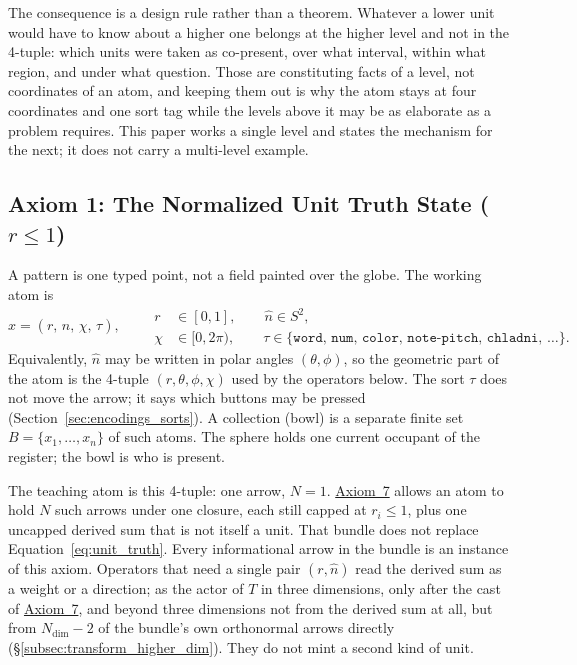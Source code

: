 \documentclass[12pt, a4paper]{article}
\begin{document}
The consequence is a design rule rather than a theorem. Whatever a
lower unit would have to know about a higher one belongs at the higher
level and not in the 4-tuple: which units were taken as co-present,
over what interval, within what region, and under what question. Those
are constituting facts of a level, not coordinates of an atom, and
keeping them out is why the atom stays at four coordinates and one
sort tag while the levels above it may be as elaborate as a problem
requires. This paper works a single level and states the mechanism for
the next; it does not carry a multi-level example.

\subsection{Axiom 1: The Normalized Unit Truth State ($r \le 1$)}
\label{subsec:axiom1}
A pattern is one typed point, not a field painted over the globe. The working atom is
\begin{equation}
    x = (r,\,\hat n,\,\chi,\,\tau),
    \qquad
    \begin{aligned}
    r &\in [0,1],
    \qquad
    \hat n \in S^2,\\
    \chi &\in [0,2\pi),
    \qquad
    \tau \in \{\mathtt{word},\,\mathtt{num},\,\mathtt{color},\,\mathtt{note\text{-}pitch},\,\mathtt{chladni},\,\ldots\}.
    \end{aligned}
    \label{eq:unit_truth}
\end{equation}
Equivalently, $\hat n$ may be written in polar angles $(\theta,\phi)$, so the geometric part of the atom is the 4-tuple $(r,\theta,\phi,\chi)$ used by the operators below. The sort $\tau$ does not move the arrow; it says which buttons may be pressed (Section~\ref{sec:encodings_sorts}). A collection (bowl) is a separate finite set $B=\{x_1,\ldots,x_n\}$ of such atoms. The sphere holds one current occupant of the register; the bowl is who is present.

The teaching atom is this 4-tuple: one arrow, $N=1$. \hyperref[subsec:axiom_v1_metrics]{Axiom~7} allows an atom to hold $N$ such arrows under one closure, each still capped at $r_i\le 1$, plus one uncapped derived sum that is not itself a unit. That bundle does not replace Equation~\eqref{eq:unit_truth}. Every informational arrow in the bundle is an instance of this axiom. Operators that need a single pair $(r,\hat n)$ read the derived sum as a weight or a direction; as the actor of $T$ in three dimensions, only after the cast of \hyperref[subsec:axiom_v1_metrics]{Axiom~7}, and beyond three dimensions not from the derived sum at all, but from $N_{\mathrm{dim}}-2$ of the bundle's own orthonormal arrows directly (\S\ref{subsec:transform_higher_dim}). They do not mint a second kind of unit.
\end{document}
